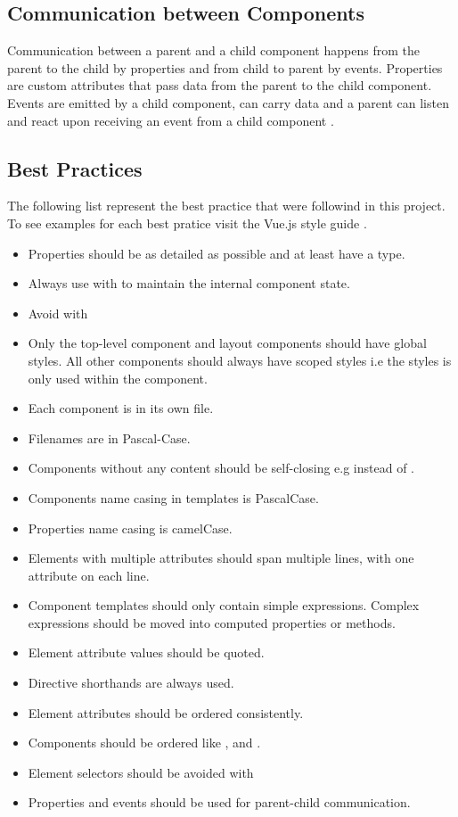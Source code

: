 \subsection{Communication between Components}
Communication between a parent and a child component happens from the parent to the child by properties and from child to parent by events. Properties are custom attributes that pass data from the parent to the child component. Events are emitted by a child component, can carry data and a parent can listen and react upon receiving an event from a child component \cite{Vue}.

\subsection{Best Practices}
The following list represent the best practice that were followind in this project. To see examples for each best pratice visit the Vue.js style guide  \cite{VueStyleGuide}.

\begin{itemize}
    \item Properties should be as detailed as possible and at least have a type.
    \item Always use  with  to maintain the internal component state.
    \item Avoid  with 
    \item Only the top-level  component and layout components should have global styles. All other components should always have scoped styles i.e the styles is only used within the component.
    \item Each component is in its own file.
    \item Filenames are in Pascal-Case.
    \item Components without any content should be self-closing e.g  instead of .
    \item Components name casing in templates is PascalCase.
    \item Properties name casing is camelCase.
    \item Elements with multiple attributes should span multiple lines, with one attribute on each line.
    \item Component templates should only contain simple expressions. Complex expressions should be moved into computed properties or methods.
    \item Element attribute values should be quoted.
    \item Directive shorthands are always used.
    \item Element attributes should be ordered consistently.
    \item Components should be ordered like ,  and .
    \item Element selectors should be avoided with 
    \item Properties and events should be used for parent-child communication.
\end{itemize}

